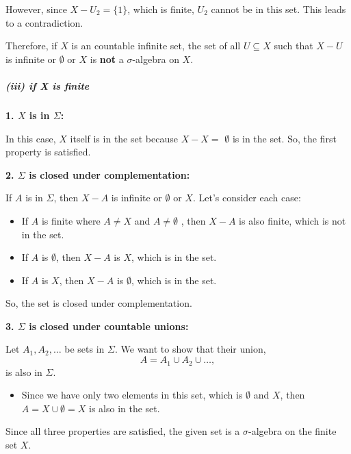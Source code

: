\documentclass[12pt]{article}
\begin{document}
\par \hspace*{1em}However, since \( X - U_2 = \{1\} \), which is finite, \( U_2 \) cannot be in this set. This leads to a contradiction.\\

\par \hspace*{1em}Therefore, if \( X \) is an countable infinite set, the set of all \( U \subseteq X \) such that \( X - U \) is infinite or \(\emptyset\) or \(X\) is \textbf{not}  a \( \sigma \)-algebra on \( X \).\\

\subparagraph{(iii) if X is finite}
\par \hspace*{1em}
\par \hspace*{1em}\textbf{1. $X$ is in $\Sigma$:}

In this case, $X$ itself is in the set because $X-X=$ \(\emptyset\) is in the set. So, the first property is satisfied.

\par \hspace*{1em}\textbf{2. $\Sigma$ is closed under complementation:}

If $A$ is in $\Sigma$, then $X - A$ is infinite or $\emptyset$ or $X$. Let's consider each case:
\begin{itemize}
    \item If $A$ is finite where $A\neq X$ and  $A\neq \emptyset$ , then $X - A$ is also finite, which is not in the set.
    \item If $A$ is $\emptyset$, then $X - A$ is $X$, which is in the set.
    \item If $A$ is $X$, then $X - A$ is $\emptyset$, which is in the set.
\end{itemize}
So, the set is closed under complementation.

\par \hspace*{1em}\textbf{3. $\Sigma$ is closed under countable unions:}

Let $A_1, A_2, \ldots$ be sets in $\Sigma$. We want to show that their union,
\[
A = A_1 \cup A_2 \cup \ldots,
\]
is also in $\Sigma$.
\begin{itemize}
    \item Since we have only two elements in this set, which is $\emptyset$ and $X$, then $A = X \cup \emptyset = X$ is also in the set.    
\end{itemize}
Since all three properties are satisfied, the given set is a $\sigma$-algebra on the finite set $X$.
\end{document}
